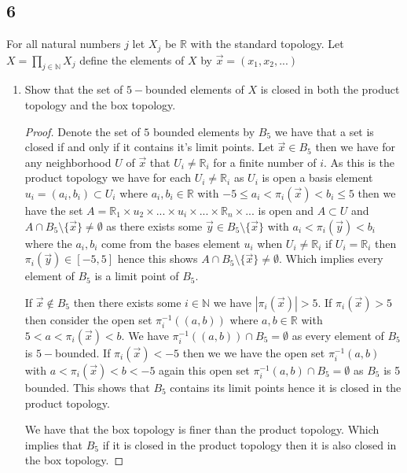 \documentclass{amsart}
\theoremstyle{plain}
\theoremstyle{definition}
\theoremstyle{remark}
\begin{document}
\subsection*{6} 
For all natural numbers $j$ let $X_j$ be $\mathbb{R}$ with the standard topology. Let $X=\prod_{j\in \mathbb{N}}X_j$ define the elements of $X$ by $\vec x=(x_1,x_2,...)$

\begin{enumerate}
    \item Show that the set of $5-$bounded elements of $X$ is closed in both the product topology and the box topology.
    \begin{proof}
        Denote the set of $5$ bounded elements by $B_5$ we have that a set is closed if and only if it contains it's limit points. Let $\vec{x}\in B_5$ then we have for any neighborhood $U$ of $\vec{x}$ that $U_i\not=  \mathbb R_i$ for a finite number of $i$. As this is the product topology we have for each $U_i\not = \mathbb{R}_i$  as $U_i$ is open a basis element $u_i=(a_i,b_i)\subset U_i $ where $a_i,b_i\in \mathbb{R}$ with $-5\leq a_i<\pi_i(\vec{x})<b_i\leq 5$ then we have the set $A=\mathbb{R}_1 \times u_2\times ...\times u_i\times ...\times \mathbb R_n \times ...$ is open and $A\subset U$ and $A\cap B_5\setminus \{\vec{x}\}\not = \emptyset$ as there exists some $\vec{y}\in B_5\setminus \{\vec{x}\}$ with $a_i<\pi_i(\vec{y})<b_i$ where the $a_i,b_i$ come from the bases element $u_i$ when $U_i\not = \mathbb{R}_i$ if $U_i=\mathbb{R}_i$ then $\pi_i(\vec{y})\in [-5,5]$ hence this shows $A\cap B_5\setminus \{\vec{x}\}\not = \emptyset$. Which implies every element of $B_5$ is a limit point of $B_5$. 

        If $\vec{x}\not \in B_5$ then there exists some $i\in \mathbb{N}$ we have $|\pi_i(\vec{x})|> 5$. If $\pi_i(\vec{x})>5$ then consider the open set $\pi_i^{-1}((a,b))$ where $a,b\in \mathbb{R}$ with $5<a<\pi_i(\vec{x})<b$. We have $\pi_i^{-1}((a,b))\cap B_5=\emptyset$ as every element of $B_5$ is $5-$bounded. If $\pi_i(\vec{x})<-5$ then we we have the open set $\pi_i^{-1}(a,b)$ with $a<\pi_i(\vec{x})<b<-5$ again this open set $\pi_i^{-1}(a,b)\cap B_5=\emptyset$ as $B_5$ is 5 bounded. This shows that $B_5$ contains its limit points hence it is closed in the product topology.

        We have that the box topology is finer than the product topology. Which implies that $B_5$ if it is closed in the product topology then it is also closed in the box topology.


\end{proof}
\end{enumerate}
\end{document}
